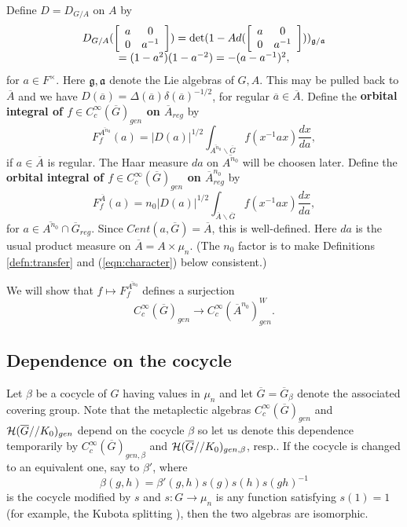 \documentclass[twocolumn,10pt]{article}
\begin{document}
Define $D=D_{G/A}$ on $A$ by
\[
\begin{array}{c}
D_{G/A}(\left[ 
\begin{array}{cc}
a & 0 \\ 
0 & a^{-1}
\end{array}
\right] )=\det (1-Ad(\left[ 
\begin{array}{cc}
a & 0 \\ 
0 & a^{-1}
\end{array}
\right] ))_{{\frak g}/{\frak a}} \\ 
=(1-a^2)(1-a^{-2})=-(a-a^{-1})^2,
\end{array}
\]
for $a\in F^{\times}$. Here ${\frak g},{\frak a}$
denote the Lie algebras of $G,A$. 
This may be pulled back to $\overline{A}$
and we have $D(\overline{a})=\Delta(\overline{a})
\delta(\overline{a})^{-1/2}$, for regular
$\overline{a}\in \overline{A}$.
Define the {\bf orbital integral of $f\in
C_c^\infty (\overline{G})_{gen}$ on $\overline{A}_{reg}$}
by 
\begin{equation}
F_f^{\overline{A^{n_0}}}(a)=|D(a)|^{1/2}\int_{\overline{A^{n_0}}\backslash 
\overline{G}}f(x^{-1}ax)\frac{dx}{da},
\label{eqn:2}
\end{equation}
if $a\in \overline{A}$ is regular.
The Haar measure $da$ on $\overline{A^{n_0}}$ will
be choosen later.
Define the {\bf orbital integral of $f\in
C_c^\infty (\overline{G})_{gen}$ on $\overline{A}^{n_0}_{reg}$}
by
\begin{equation}
F_f^{\overline{A}}(a)=n_0|D(a)|^{1/2}
\int_{\overline{A}\backslash \overline{G}}
f(x^{-1}ax)\frac{dx}{da},
\end{equation}
for $a\in \overline{A^{n_0}}\cap \overline{G}_{reg}$.
Since $Cent(a,\overline{G})=\overline{A}$, this is well-defined. 
Here $da$ is the usual product measure on $\overline{A}
=A\times \mu_n$. (The $n_0$ factor is to make Definitions
\ref{defn:transfer} and (\ref{eqn:character}) below
consistent.)

We will show that $f\longmapsto F_f^{\overline{A^{n_0}}}$ defines a 
surjection
\[
C_c^\infty(\overline{G})_{gen}
\rightarrow 
C_c^\infty(\overline{A}^{n_0})^W_{gen}.
\]

\subsection{Dependence on the cocycle}

Let $\beta$ be a cocycle of $G$ having values in $\mu_n$
and let $\overline{G}=\overline{G}_\beta$ denote the
associated covering group.
Note that the metaplectic algebras 
$C_c^\infty(\overline{G})_{gen}$
and ${\cal H}(\overline{G}//K_0)_{gen}$
depend on the cocycle $\beta$
so let us denote this dependence temporarily by
$C_c^\infty(\overline{G})_{gen,\beta}$
and ${\cal H}(\overline{G}//K_0)_{gen,\beta}$,
resp..
If the cocycle is changed to an equivalent one,
say to $\beta'$, where 
\[
\beta(g,h)=\beta'(g,h)s(g)s(h)s(gh)^{-1}
\]
is the cocycle modified by $s$ 
and $s:G\rightarrow \mu_n$ is any function
satisfying $s(1)=1$
(for example, the Kubota splitting
\cite{KP}), then the two algebras are 
isomorphic.
\end{document}

